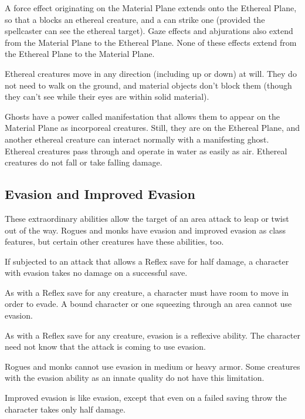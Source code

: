 A force effect originating on the Material Plane extends onto the Ethereal Plane, 
so that a  blocks an ethereal creature, and a 
can strike one (provided the spellcaster can see the ethereal target). 
Gaze effects and abjurations also extend from the Material Plane to the Ethereal 
Plane. None of these effects extend from the Ethereal Plane to the Material Plane.

Ethereal creatures move in any direction (including up or down) at will. They do 
not need to walk on the ground, and material objects don't block them (though they 
can't see while their eyes are within solid material).

Ghosts have a power called manifestation that allows them to appear on the Material 
Plane as incorporeal creatures. Still, they are on the Ethereal Plane, and another 
ethereal creature can interact normally with a manifesting ghost. Ethereal creatures 
pass through and operate in water as easily as air. Ethereal creatures do not fall 
or take falling damage. 

\subsection{Evasion and Improved Evasion}

These extraordinary abilities allow the target of an area attack to leap or twist 
out of the way. Rogues and monks have evasion and improved evasion as class features, 
but certain other creatures have these abilities, too.

If subjected to an attack that allows a Reflex save for half damage, a character 
with evasion takes no damage on a successful save. 

As with a Reflex save for any creature, a character must have room to move in order 
to evade. A bound character or one squeezing through an area cannot use evasion.

As with a Reflex save for any creature, evasion is a reflexive ability. The character 
need not know that the attack is coming to use evasion.

Rogues and monks cannot use evasion in medium or heavy armor. Some creatures with 
the evasion ability as an innate quality do not have this limitation.

Improved evasion is like evasion, except that even on a failed saving throw the 
character takes only half damage.

